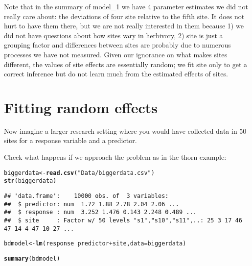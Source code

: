 \documentclass[12pt,a4paper]{scrartcl}\usepackage[]{graphicx}\usepackage[]{color}
\makeatletter
\newcommand{\hlstr}[1]{\textcolor[rgb]{0.192,0.494,0.8}{#1}}%
\newcommand{\hlopt}[1]{\textcolor[rgb]{0,0,0}{#1}}%
\newcommand{\hlstd}[1]{\textcolor[rgb]{0.345,0.345,0.345}{#1}}%
\newcommand{\hlkwb}[1]{\textcolor[rgb]{0.69,0.353,0.396}{#1}}%
\newcommand{\hlkwc}[1]{\textcolor[rgb]{0.333,0.667,0.333}{#1}}%
\newcommand{\hlkwd}[1]{\textcolor[rgb]{0.737,0.353,0.396}{\textbf{#1}}}%
\newenvironment{kframe}{%
 \def\at@end@of@kframe{}%
 \ifinner\ifhmode%
  \def\at@end@of@kframe{\end{minipage}}%
  \begin{minipage}{\columnwidth}%
 \fi\fi%
 \def\FrameCommand##1{\hskip\@totalleftmargin \hskip-\fboxsep
 \colorbox{shadecolor}{##1}\hskip-\fboxsep
     \hskip-\linewidth \hskip-\@totalleftmargin \hskip\columnwidth}%
 \MakeFramed {\advance\hsize-\width
   \@totalleftmargin\z@ \linewidth\hsize
   \@setminipage}}%
 {\par\unskip\endMakeFramed%
 \at@end@of@kframe}
\newenvironment{knitrout}{}{} %
\makeatother
\begin{document}
Note that in the summary of model\_1 we have 4 parameter estimates we did not really care about: the deviations of four site relative to the fifth site. It does not hurt to have them there, but we are not really interested in them because 1) we did not have questions about how sites vary in herbivory, 2) site is just a grouping factor and differences between sites are probably due to numerous processes we have not measured. Given our ignorance on what makes sites different, the values of site effects are essentially random; we fit site only to get a correct inference but do not learn much from the estimated effects of sites.

\section{Fitting random effects}

Now imagine a larger research setting where you would have collected data in 50 sites for a response variable and a predictor.


Check what happens if we approach the problem as in the thorn example:
\begin{knitrout}
\color{fgcolor}\begin{kframe}
\begin{alltt}
\hlstd{biggerdata} \hlkwb{<-} \hlkwd{read.csv}\hlstd{(}\hlstr{"Data/biggerdata.csv"}\hlstd{)}
\hlkwd{str}\hlstd{(biggerdata)}
\end{alltt}
\begin{verbatim}
## 'data.frame':	10000 obs. of  3 variables:
##  $ predictor: num  1.72 1.88 2.78 2.04 2.06 ...
##  $ response : num  3.252 1.476 0.143 2.248 0.489 ...
##  $ site     : Factor w/ 50 levels "s1","s10","s11",..: 25 3 17 46 47 14 4 47 10 27 ...
\end{verbatim}
\begin{alltt}
\hlstd{bdmodel} \hlkwb{<-} \hlkwd{lm}\hlstd{(response} \hlopt{~} \hlstd{predictor} \hlopt{+} \hlstd{site,} \hlkwc{data} \hlstd{= biggerdata)}
\end{alltt}
\end{kframe}
\end{knitrout}
\begin{knitrout}
\color{fgcolor}\begin{kframe}
\begin{alltt}
\hlkwd{summary}\hlstd{(bdmodel)}
\end{alltt}
\end{kframe}
\end{knitrout}
\end{document}
